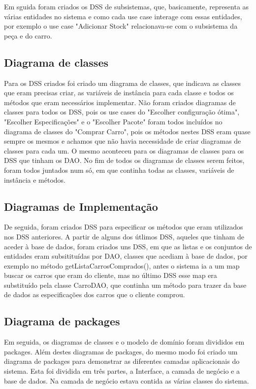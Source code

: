 \documentclass[10pt, a4paper]{article}
\begin{document}
Em sguida foram criados os DSS de subsistemas, que, basicamente, representa as várias entidades no sistema e como cada use case interage com essas entidades, por exemplo o use case "Adicionar Stock" relacionava-se com o subsistema da peça e do carro. 


\newpage
\subsection{Diagrama de classes}
Para os DSS criados foi criado um diagrama de classes, que indicava as classes que eram precisas criar, as variáveis de instância para cada classe e todos os métodos que eram necessários implementar. Não foram criados diagramas de classes para todos os DSS, pois os use cases do "Escolher configuração ótima", "Escolher Especificações" e o "Escolher Pacote" foram todos incluídos no diagrama de classes do "Comprar Carro", pois os métodos nestes DSS eram quase sempre os mesmos e achamos que não havia necessidade de criar diagramas de classes para cada um. O mesmo aconteceu para os diagramas de classes para os DSS que tinham os DAO.
No fim de todos os diagramas de classes serem feitos, foram todos juntados num só, em que continha todas as classes, variáveis de instância e métodos.


\subsection{Diagramas de Implementação}
De seguida, foram criados DSS para especificar os métodos que eram utilizados nos DSS anteriores. A partir de alguns dos útlimos DSS, aqueles que tinham de aceder à base de dados, foram criados uns DSS, em que as listas e os conjuntos de entidades eram subsitituídas por DAO, classes que acediam à base de dados, por exemplo no método getListaCarrosComprados(), antes o sistema ia a um map buscar os carros que eram do cliente, mas no último DSS esse map era substituído pela classe CarroDAO, que continha um método para trazer da base de dados as especificações dos carros que o cliente comprou.


\subsection{Diagrama de packages}
Em seguida, os diagramas de classes e o modelo de domínio foram divididos em packages. Além destes diagramas de packages, do mesmo modo foi criado um diagrama de packages para demonstrar as diferentes camadas aplicacionais do sistema. Esta foi dividida em três partes, a Interface, a camada de negócio e a base de dados. Na camada de negócio estava contida as várias classes do sistema.
\end{document}

